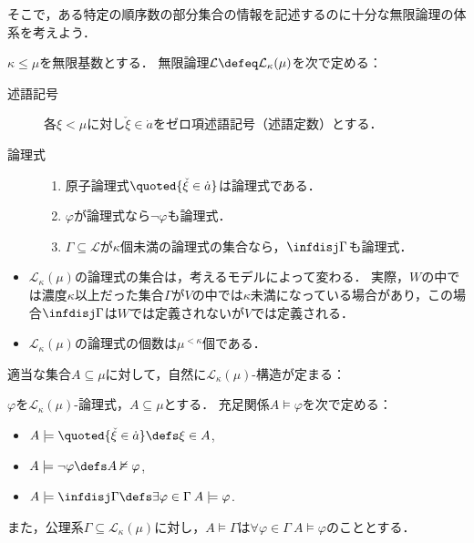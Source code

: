\documentclass[a4j,leqno]{ltjsarticle}
\begin{document}
そこで，ある特定の順序数の部分集合の情報を記述するのに十分な無限論理の体系を考えよう．
\begin{definition}
 $\kappa \leq \mu$を無限基数とする．
 無限論理$\mathcal{L} \defeq \mathcal{L}_\kappa(\mu)$を次で定める：
 \begin{description}
  \item[述語記号] 各$\xi < \mu$に対し$\check{\xi} \in \dot{a}$をゼロ項述語記号（述語定数）とする．
  \item[論理式]
  \begin{enumerate}
   \item 原子論理式$\quoted{\check{\xi} \in \dot{a}}$は論理式である．
   \item $\varphi$が論理式なら$\neg \varphi$も論理式．
   \item $\Gamma \subseteq \mathcal{L}$が$\kappa$個未満の論理式の集合なら，$\infdisj \Gamma$も論理式．
  \end{enumerate}
 \end{description}
\end{definition}
\begin{remark}
 \begin{itemize}
  \item $\mathcal{L}_\kappa(\mu)$の論理式の集合は，考えるモデルによって変わる．
 実際，$W$の中では濃度$\kappa$以上だった集合$\Gamma$が$V$の中では$\kappa$未満になっている場合があり，この場合$\infdisj \Gamma$は$W$では定義されないが$V$では定義される．
  \item $\mathcal{L}_{\kappa}(\mu)$の論理式の個数は$\mu^{<\kappa}$個である．
 \end{itemize}
\end{remark}
適当な集合$A \subseteq \mu$に対して，自然に$\mathcal{L}_\kappa(\mu)$-構造が定まる：
\begin{definition}
 $\varphi$を$\mathcal{L}_\kappa(\mu)$-論理式，$A \subseteq \mu$とする．
 充足関係$A \models \varphi$を次で定める：
 \begin{itemize}
  \item $A \models \quoted{\check{\xi} \in \dot{a}} \defs \xi \in A$,
  \item $A \models \neg \varphi \defs A \nvDash \varphi$,
  \item $A \models \infdisj \Gamma \defs \exists \varphi \in \Gamma \: A \models \varphi$.
 \end{itemize}
 また，公理系$\Gamma \subseteq \mathcal{L}_{\kappa}(\mu)$に対し，$A \models \Gamma$は$\forall \varphi \in \Gamma \: A \models \varphi$のこととする．
\end{definition}
\end{document}
